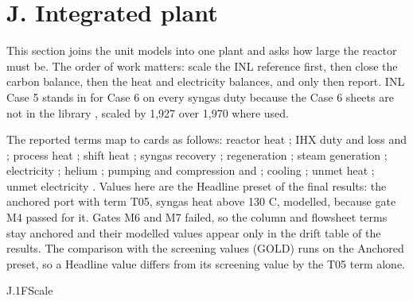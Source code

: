 \section{J. Integrated plant}\label{sec:J}
This section joins the unit models into one plant and asks how large the reactor must be. The order of work matters: scale the INL reference first, then close the carbon balance, then the heat and electricity balances, and only then report. INL Case 5 stands in for Case 6 on every syngas duty because the Case 6 sheets are not in the library , scaled by 1,927 over 1,970 where used.

The reported terms map to cards as follows: reactor heat ; IHX duty and loss  and ; process heat ; shift heat ; syngas recovery ; regeneration ; steam generation ; electricity ; helium ; pumping and compression  and ; cooling ; unmet heat ; unmet electricity . Values here are the Headline preset of the final results: the anchored port with term T05, syngas heat above 130 C, modelled, because gate M4 passed for it. Gates M6 and M7 failed, so the column and flowsheet terms stay anchored and their modelled values appear only in the drift table of the results. The comparison with the screening values (GOLD) runs on the Anchored preset, so a Headline value differs from its screening value by the T05 term alone.

\begin{eqcard}{J.1}{F}{Scale}
\end{eqcard}

